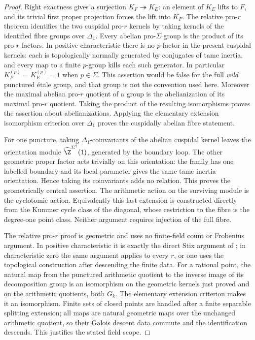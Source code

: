 \begin{proof}
Right exactness gives a surjection $K_F\twoheadrightarrow K_E$:
an element of $K_E$ lifts to $F$, and its trivial first proper projection
forces the lift into $K_F$. The relative pro-$r$ theorem identifies the
two cuspidal pro-$r$ kernels by taking kernels of the identified fibre
groups over $\Delta_1$. Every abelian pro-$\Sigma$ group is the product
of its pro-$r$ factors. In positive characteristic there is no $p$
factor in the present cuspidal
kernels: each is topologically normally generated by conjugates of
tame inertia, and every map to a finite $p$-group kills each such
generator. In particular $K_F^{(p)}=K_E^{(p)}=1$ when $p\in\Sigma$.
This assertion would be false for the full \emph{wild} punctured
\'etale group, and that group is not the convention used here.
Moreover the maximal abelian pro-$r$ quotient of
a group is the abelianization of its maximal pro-$r$ quotient. Taking
the product of the resulting isomorphisms proves the assertion about
abelianizations. Applying the elementary extension isomorphism criterion
over $\Delta_1$ proves the cuspidally abelian fibre statement.

For one puncture, taking $\Delta_1$-coinvariants of the abelian cuspidal
kernel leaves the orientation module
$\widehat{\Z}^{\Sigma^\dagger}(1)$, generated by the boundary loop. The other
geometric proper factor acts trivially on this orientation: the family
has one labelled boundary and its local parameter gives the same tame
inertia orientation. Hence taking its coinvariants adds no relation.
This proves the geometrically central assertion. The arithmetic action
on the surviving module is the cyclotomic action. Equivalently this
last extension is constructed directly from the Kummer cycle class of
the diagonal, whose restriction to the fibre is the degree-one point
class. Neither argument requires injection of the full fibre.

The relative pro-$r$ proof is geometric and uses no finite-field
count or Frobenius argument. In positive characteristic it is
exactly the direct Stix argument of ; in
characteristic zero the same argument applies to every $r$, or
one uses the topological construction after descending the finite
data. For a rational point, the natural map from the punctured
arithmetic quotient to the inverse image of its decomposition
group is an isomorphism on the geometric kernels just proved and
on the arithmetic quotients, both $G_k$. The elementary extension
criterion makes it an isomorphism. Finite sets of closed points
are handled after a finite separable splitting extension; all
maps are natural geometric maps over the unchanged arithmetic
quotient, so their Galois descent data commute and the
identification descends. This justifies the stated field scope.
\end{proof}

